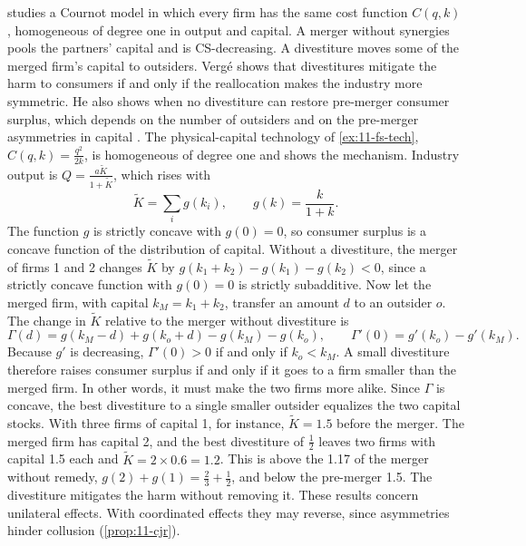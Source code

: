\citet{Verge2010} studies a Cournot model in which every firm has the same cost function $C(q, k)$, homogeneous of
degree one in output and capital. A merger without synergies pools the partners' capital and is CS-decreasing. A
divestiture moves some of the merged firm's capital to outsiders. Vergé shows that divestitures mitigate the harm to
consumers if and only if the reallocation makes the industry more symmetric. He also shows when no divestiture can
restore pre-merger consumer surplus, which depends on the number of outsiders and on the pre-merger asymmetries in
capital \citep[pp.~253--254]{AskerNocke2021}.
The physical-capital technology of \cref{ex:11-fs-tech}, $C(q, k) =
\frac{q^2}{2k}$, is homogeneous of degree one and shows the mechanism. Industry output is $Q = \frac{a\tilde K}{1 +
\tilde K}$, which rises with
\begin{equation*}
\tilde K = \sum_i g(k_i), \qquad g(k) = \frac{k}{1 + k} .
\end{equation*}
The function $g$ is strictly concave with $g(0) = 0$, so consumer surplus is a concave function of the distribution of
capital. Without a divestiture, the merger of firms 1 and 2 changes $\tilde K$ by $g(k_1 + k_2) - g(k_1) - g(k_2) < 0$,
since a strictly concave function with $g(0) = 0$ is strictly subadditive. Now let the merged firm, with capital $k_M =
k_1 + k_2$, transfer an amount $d$ to an outsider $o$. The change in $\tilde K$ relative to the merger without divestiture is
\begin{equation*}
\Gamma(d) = g(k_M - d) + g(k_o + d) - g(k_M) - g(k_o),
\qquad
\Gamma'(0) = g'(k_o) - g'(k_M) .
\end{equation*}
Because $g'$ is decreasing, $\Gamma'(0) > 0$ if and only if $k_o < k_M$. A small divestiture therefore raises
consumer surplus if and only if it goes to a firm smaller than the merged firm. In other words, it must make the two
firms more alike. Since $\Gamma$ is concave, the best divestiture to a single smaller outsider equalizes the two capital stocks.
With three firms of capital 1, for instance, $\tilde K = 1.5$ before the merger. The merged firm has capital 2, and
the best divestiture of $\frac{1}{2}$ leaves two firms with capital 1.5 each and $\tilde K = 2 \times 0.6 = 1.2$. This is
above the 1.17 of the merger without remedy, $g(2) + g(1) = \frac{2}{3} + \frac{1}{2}$, and below the pre-merger 1.5. The
divestiture mitigates the harm without removing it. These results concern unilateral effects. With coordinated effects they may reverse,
since asymmetries hinder collusion (\cref{prop:11-cjr}).

